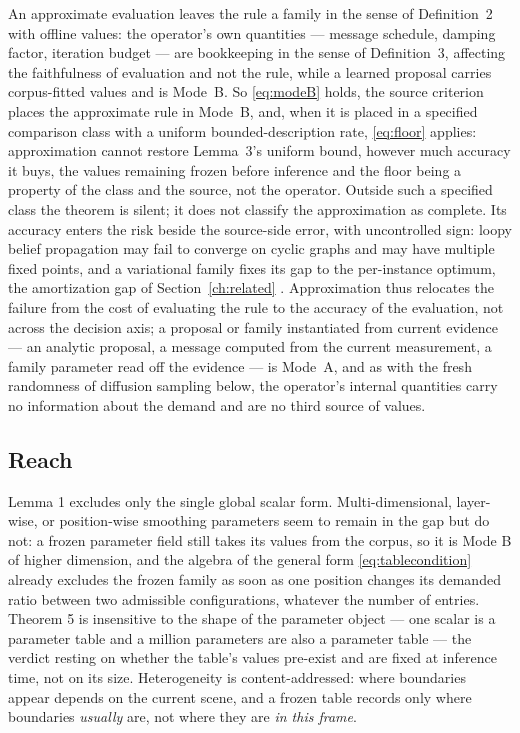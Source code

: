An approximate evaluation leaves the rule a family in the sense of Definition~2 with offline values: the operator's own quantities --- message schedule, damping factor, iteration budget --- are bookkeeping in the sense of Definition~3, affecting the faithfulness of evaluation and not the rule, while a learned proposal carries corpus-fitted values and is Mode~B. So \eqref{eq:modeB} holds, the source criterion places the approximate rule in Mode~B, and, when it is placed in a specified comparison class with a uniform bounded-description rate, \eqref{eq:floor} applies: approximation cannot restore Lemma~3's uniform bound, however much accuracy it buys, the values remaining frozen before inference and the floor being a property of the class and the source, not the operator. Outside such a specified class the theorem is silent; it does not classify the approximation as complete. Its accuracy enters the risk beside the source-side error, with uncontrolled sign: loopy belief propagation may fail to converge on cyclic graphs and may have multiple fixed points, and a variational family fixes its gap to the per-instance optimum, the amortization gap of Section~\ref{ch:related} \citep{cremer2018}. Approximation thus relocates the failure from the cost of evaluating the rule to the accuracy of the evaluation, not across the decision axis; a proposal or family instantiated from current evidence --- an analytic proposal, a message computed from the current measurement, a family parameter read off the evidence --- is Mode~A, and as with the fresh randomness of diffusion sampling below, the operator's internal quantities carry no information about the demand and are no third source of values.

\subsection{Reach}

Lemma 1 excludes only the single global scalar form. Multi-dimensional, layer-wise, or position-wise smoothing parameters seem to remain in the gap but do not: a frozen parameter field still takes its values from the corpus, so it is Mode B of higher dimension, and the algebra of the general form \eqref{eq:tablecondition} already excludes the frozen family as soon as one position changes its demanded ratio between two admissible configurations, whatever the number of entries. Theorem 5 is insensitive to the shape of the parameter object --- one scalar is a parameter table and a million parameters are also a parameter table --- the verdict resting on whether the table's values pre-exist and are fixed at inference time, not on its size. Heterogeneity is content-addressed: where boundaries appear depends on the current scene, and a frozen table records only where boundaries \emph{usually} are, not where they are \emph{in this frame}.

